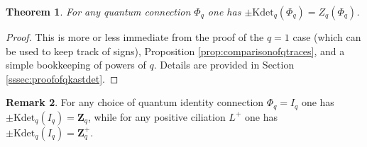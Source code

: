\documentclass[12pt, reqno]{amsart}
\newtheorem{theo}{Theorem}[section]
\theoremstyle{definition}
\newtheorem{rema}[theo]{Remark}
\newcommand{\Zqc}{Z_q}%
\newcommand{\Zq}{\mathbf{Z}_q}%
\newcommand{\Kdetq}{\mathrm{Kdet}_q}%
\begin{document}
\begin{theo}\label{theo:quantumkasteleyndet}
For any quantum connection $\Phi_q$ one has $\pm \Kdetq(\Phi_q)=\Zqc(\Phi_q)$.
\end{theo}

\begin{proof}  
This is more or less immediate from the proof of the $q=1$ case (which can be used to keep track of signs), Proposition \ref{prop:comparisonofqtraces}, and a simple bookkeeping of powers of $q$.  Details are provided in Section \ref{sssec:proofofqkastdet}.
\end{proof}

\begin{rema}
\item  For any choice of quantum identity connection $\Phi_q=I_q$ one has $\pm \Kdetq(I_q)=\Zq$, while for any positive ciliation $L^+$ one has $\pm \Kdetq(I_q)= \Zq^+$.
\end{rema}
\end{document}
